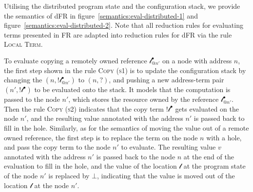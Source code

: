 Utilising the distributed program state and the configuration stack, we provide the semantics of dFR in figure~\ref{semantics:eval-distributed-1} and figure~\ref{semantics:eval-distributed-2}. Note that all reduction rules for evaluating terms presented in FR are adapted into reduction rules for dFR via the rule \textsc{Local Term}. 

To evaluate copying a remotely owned reference $\mathscr{l}^\bullet_{@n'}$ on a node with address $n$, the first step shown in the rule \textsc{Copy (s1)} is to update the configuration stack by changing the $(n, !\mathscr{l}^\bullet_{@n'})$ to $(n, ?)$, and pushing a new address-term pair $(n', !\mathscr{l}^\bullet)$ to be evaluated onto the stack. It models that the computation is passed to the node $n'$, which stores the resource owned by the reference $\mathscr{l}^\bullet_{@n'}$. Then the rule \textsc{Copy (s2)} indicates that the copy term $!\mathscr{l}^\bullet$ gets evaluated on the node $n'$, and the resulting value annotated with the address $n'$ is passed back to fill in the hole. Similarly, as for the semantics of moving the value out of a remote owned reference, the first step is to replace the term on the node $n$ with a hole, and pass the copy term to the node $n'$ to evaluate. The resulting value $v$ annotated with the address $n'$ is passed back to the node $n$ at the end of the evaluation to fill in the hole, and the value of the location $\mathscr{l}$ at the program state of the node $n'$ is replaced by $\bot$, indicating that the value is moved out of the location $\mathscr{l}$ at the node $n'$.

